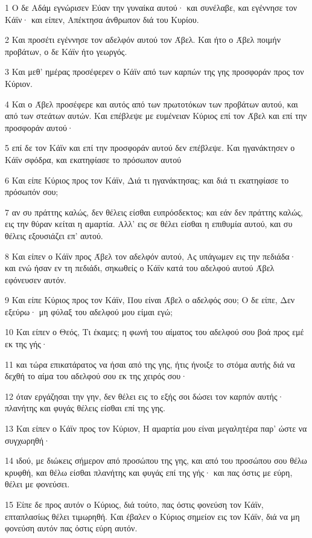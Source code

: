 \par 1 Ο δε Αδάμ εγνώρισεν Εύαν την γυναίκα αυτού· και συνέλαβε, και εγέννησε τον Κάϊν· και είπεν, Απέκτησα άνθρωπον διά του Κυρίου.
\par 2 Και προσέτι εγέννησε τον αδελφόν αυτού τον Άβελ. Και ήτο ο Άβελ ποιμήν προβάτων, ο δε Κάϊν ήτο γεωργός.
\par 3 Και μεθ' ημέρας προσέφερεν ο Κάϊν από των καρπών της γης προσφοράν προς τον Κύριον.
\par 4 Και ο Άβελ προσέφερε και αυτός από των πρωτοτόκων των προβάτων αυτού, και από των στεάτων αυτών. Και επέβλεψε με ευμένειαν Κύριος επί τον Άβελ και επί την προσφοράν αυτού·
\par 5 επί δε τον Κάϊν και επί την προσφοράν αυτού δεν επέβλεψε. Και ηγανάκτησεν ο Κάϊν σφόδρα, και εκατηφίασε το πρόσωπον αυτού
\par 6 Και είπε Κύριος προς τον Κάϊν, Διά τι ηγανάκτησας; και διά τι εκατηφίασε το πρόσωπόν σου;
\par 7 αν συ πράττης καλώς, δεν θέλεις είσθαι ευπρόσδεκτος; και εάν δεν πράττης καλώς, εις την θύραν κείται η αμαρτία. Αλλ' εις σε θέλει είσθαι η επιθυμία αυτού, και συ θέλεις εξουσιάζει επ' αυτού.
\par 8 Και είπεν ο Κάϊν προς Άβελ τον αδελφόν αυτού, Ας υπάγωμεν εις την πεδιάδα· και ενώ ήσαν εν τη πεδιάδι, σηκωθείς ο Κάϊν κατά του αδελφού αυτού Άβελ εφόνευσεν αυτόν.
\par 9 Και είπε Κύριος προς τον Κάϊν, Που είναι Άβελ ο αδελφός σου; Ο δε είπε, Δεν εξεύρω· μη φύλαξ του αδελφού μου είμαι εγώ;
\par 10 Και είπεν ο Θεός, Τι έκαμες; η φωνή του αίματος του αδελφού σου βοά προς εμέ εκ της γής·
\par 11 και τώρα επικατάρατος να ήσαι από της γης, ήτις ήνοιξε το στόμα αυτής διά να δεχθή το αίμα του αδελφού σου εκ της χειρός σου·
\par 12 όταν εργάζησαι την γην, δεν θέλει εις το εξής σοι δώσει τον καρπόν αυτής· πλανήτης και φυγάς θέλεις είσθαι επί της γης.
\par 13 Και είπεν ο Κάϊν προς τον Κύριον, Η αμαρτία μου είναι μεγαλητέρα παρ' ώστε να συγχωρηθή·
\par 14 ιδού, με διώκεις σήμερον από προσώπου της γης, και από του προσώπου σου θέλω κρυφθή, και θέλω είσθαι πλανήτης και φυγάς επί της γής· και πας όστις με εύρη, θέλει με φονεύσει.
\par 15 Είπε δε προς αυτόν ο Κύριος, διά τούτο, πας όστις φονεύση τον Κάϊν, επταπλασίως θέλει τιμωρηθή. Και έβαλεν ο Κύριος σημείον εις τον Κάϊν, διά να μη φονεύση αυτόν πας όστις εύρη αυτόν.
